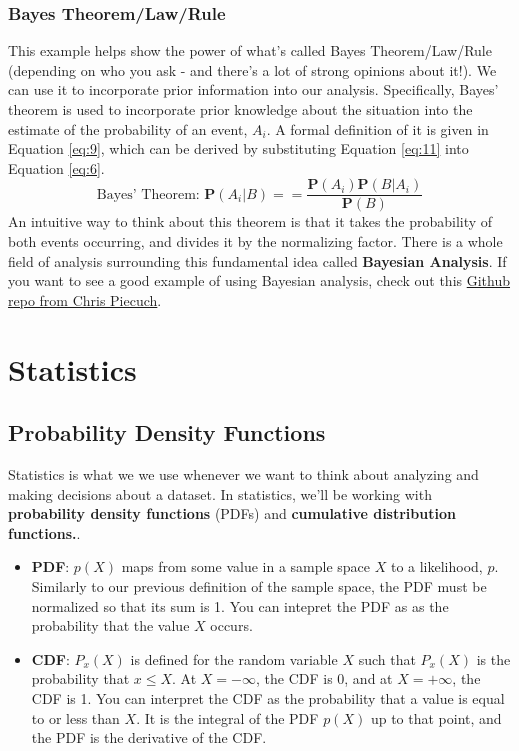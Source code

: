 \documentclass{article}
\begin{document}

\subsubsection{Bayes Theorem/Law/Rule}
This example helps show the power of what's called Bayes Theorem/Law/Rule (depending on who you ask - and there's a lot of strong opinions about it!). We can use it to incorporate prior information into our analysis. Specifically, Bayes' theorem is  used to incorporate prior knowledge about the situation into the estimate of the probability of an event, $A_i$. A formal definition of it is given in Equation \ref{eq:9}, which can be derived by substituting Equation \ref{eq:11} into Equation \ref{eq:6}. 
\begin{equation}
\label{eq:9}
\text{Bayes' Theorem: }\mathbf{P} (A_i|B) ==\frac{\mathbf{P}(A_i)\mathbf{P}(B|A_i)}{\mathbf{P}(B)}
\end{equation}
An intuitive way to think about this theorem is that it takes the probability of both events occurring, and divides it by the normalizing factor. 
There is a whole field of analysis surrounding this fundamental idea called \textbf{Bayesian Analysis}. If you want to see a good example of using Bayesian analysis, check out this \href{https://github.com/christopherpiecuch/bevir}{Github repo from Chris Piecuch}.

\section{Statistics}
\subsection{Probability Density Functions}
Statistics is what we we use whenever we want to think about analyzing and making decisions about a dataset. In statistics, we'll be working with \textbf{probability density functions} (PDFs) and \textbf{cumulative distribution functions.}.
\begin{itemize}

\item \textbf{PDF}: $p(X)$ maps from some value in a sample space $X$ to a likelihood, $p$. Similarly to our previous definition of the sample space, the PDF must be normalized so that its sum is 1. You can intepret the PDF as as the probability that the value $X$ occurs. 

\item \textbf{CDF}: $P_{x}(X)$ is defined for the random variable $X$ such that $P_x(X)$ is the probability that $x \leq X$. At $X = -\infty$, the CDF is 0, and at $X = +\infty$, the CDF is 1. You can interpret the CDF as the probability that a value is equal to or less than $X$. It is the integral of the PDF $p(X)$ up to that point, and the PDF is the derivative of the CDF.
  \end{itemize}
\end{document}
